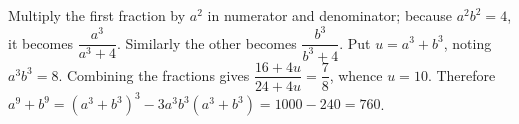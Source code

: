 Multiply the first fraction by $a^2$ in numerator and denominator; because $a^2b^2=4$, it becomes $\dfrac{a^3}{a^3+4}$. Similarly the other becomes $\dfrac{b^3}{b^3+4}$. Put $u=a^3+b^3$, noting $a^3b^3=8$. Combining the fractions gives $\dfrac{16+4u}{24+4u}=\dfrac{7}{8}$, whence $u=10$. Therefore $a^9+b^9=(a^3+b^3)^3-3a^3b^3(a^3+b^3)=1000-240=\boxed{760}$.
